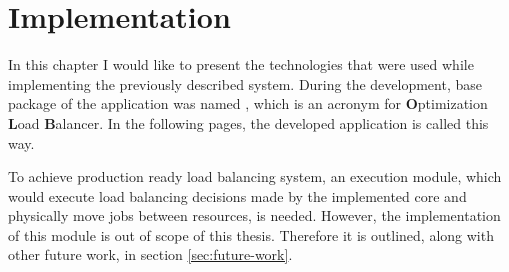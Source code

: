 \chapter{Implementation}\label{ch:implementation}
In this chapter I would like to present the technologies that were used while implementing the previously described system.
During the development,
base package of the application was named ,
which is an acronym for \textbf{O}ptimization \textbf{L}oad \textbf{B}alancer.
In the following pages, 
the developed application is called this way.

To achieve production ready load balancing system, 
an execution module, which would execute load balancing decisions made by the implemented core and physically move jobs between resources,
is needed.
However,
the implementation of this module is out of scope of this thesis.
Therefore it is outlined, along with other future work, in section \ref{sec:future-work}.







